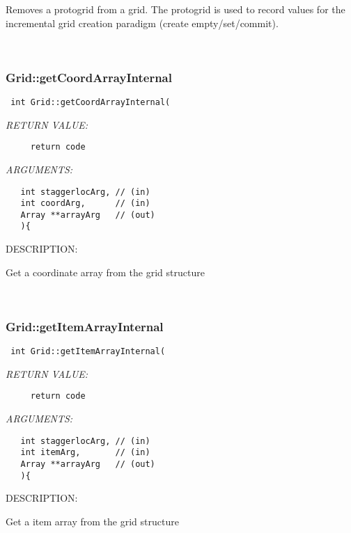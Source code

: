      Removes a protogrid from a grid. The protogrid is used to record
     values for the incremental grid creation paradigm 
     (create empty/set/commit).
   
 
\mbox{}\hrulefill\
 
\subsubsection [Grid::getCoordArrayInternal] {Grid::getCoordArrayInternal}


  
\begin{verbatim} int Grid::getCoordArrayInternal(\end{verbatim}{\em RETURN VALUE:}
\begin{verbatim}     return code\end{verbatim}{\em ARGUMENTS:}
\begin{verbatim}   int staggerlocArg, // (in)
   int coordArg,      // (in)
   Array **arrayArg   // (out)
   ){\end{verbatim}
{\sf DESCRIPTION:\\ }


     Get a coordinate array from the grid structure
   
 
\mbox{}\hrulefill\
 
\subsubsection [Grid::getItemArrayInternal] {Grid::getItemArrayInternal}


  
\begin{verbatim} int Grid::getItemArrayInternal(\end{verbatim}{\em RETURN VALUE:}
\begin{verbatim}     return code\end{verbatim}{\em ARGUMENTS:}
\begin{verbatim}   int staggerlocArg, // (in)
   int itemArg,       // (in)
   Array **arrayArg   // (out)
   ){\end{verbatim}
{\sf DESCRIPTION:\\ }


     Get a item array from the grid structure
   
